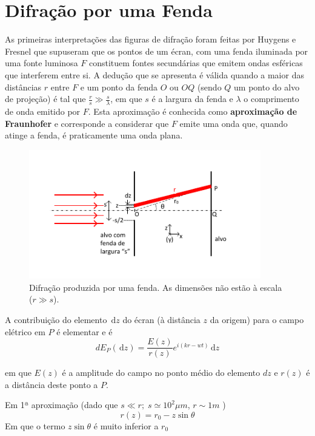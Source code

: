 \documentclass[a4paper,12pt]{article}
\newcommand{\ud}{\,\mathrm{d}}
\begin{document}

\section{ \sf Difração por uma Fenda}
\label{sec:fenda} 
As primeiras interpretações das figuras de difração foram feitas por Huygens e Fresnel que supuseram que os pontos de um écran, com uma fenda iluminada por uma fonte luminosa $F$ constituem fontes secundárias que emitem ondas esféricas que interferem entre si. A dedução que se apresenta é válida quando a maior das distâncias $r$ entre $F$ e um ponto da fenda $O$ ou $OQ$ (sendo $Q$ um ponto do alvo de projeção) é tal que $\frac{r}{s} \gg \frac{s}{\lambda}$, em que $s$ é a largura da fenda e $\lambda$ o comprimento de onda emitido por $F$. Esta aproximação é conhecida como {\bf aproximação de Fraunhofer} e corresponde a considerar que $F$ emite uma onda que, quando atinge a fenda, é praticamente uma onda plana.

\begin{figure}[tb]  \centering 
	\includegraphics[width=0.9\textwidth]{fenda} 
	\caption{Difração produzida por uma fenda. As dimensões não estão à escala ($r \gg s$).\label{fig:3}} 
\end{figure}

A contribuição do elemento $\ud z$ do écran (à distância $z$ da origem) para o campo elétrico em $P$ é elementar e é 
\begin{equation}
	\label{eq:25} dE_P(\ud z) = \frac{E(z)}{r(z)} e^{i(kr- wt)} \ud z 
\end{equation}

em que $E(z)$ é a amplitude do campo no ponto médio do elemento $dz$ e $r(z)$ é a distância deste ponto a $P$.

Em 1ª aproximação (dado que $s \ll r;\; s \simeq 10^2 \mu m$, $r \sim 1m$ ) 
\begin{equation}
	\label{eq:26} r(z)= r_0 - z \sin \theta 
\end{equation}
Em que o termo $z \sin \theta $ é muito inferior a $r_0$
\end{document}
